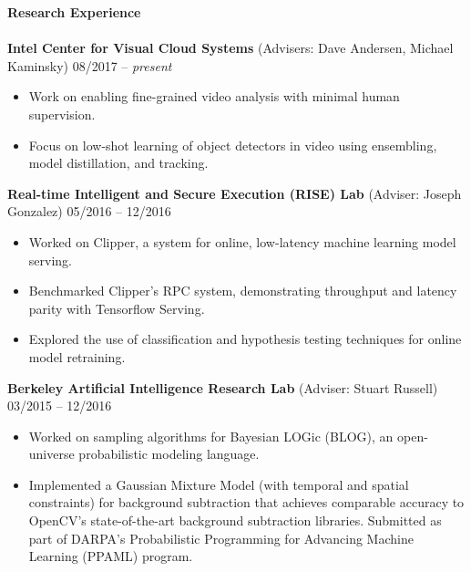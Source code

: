 \documentclass{article}
\begin{document}
\noindent
\textbf{{\Large Research Experience}}\\[-2mm]
\HRule\\
\noindent
\textbf{Intel Center for Visual Cloud Systems} (Advisers: Dave Andersen, Michael Kaminsky)
\hfill 08/2017 -- \textit{present}
\begin{itemize}
\vspace{-2.5mm}
\item Work on enabling fine-grained video analysis with minimal human supervision.
\vspace{-2.5mm}
\item Focus on low-shot learning of object detectors in video using ensembling, model distillation, and tracking.
\end{itemize}
\vspace{-2mm}

\noindent
\textbf{Real-time Intelligent and Secure Execution (RISE) Lab} (Adviser: Joseph Gonzalez)
\hfill 05/2016 -- 12/2016
\begin{itemize}
\vspace{-2.5mm}
\item Worked on Clipper, a system for online, low-latency machine learning model serving.
\vspace{-2.5mm}
\item Benchmarked Clipper's RPC system, demonstrating throughput and latency parity with Tensorflow Serving.
\vspace{-2.5mm}
\item Explored the use of classification and hypothesis testing techniques for online model retraining.
\end{itemize}
\vspace{-2mm}

\noindent
\textbf{Berkeley Artificial Intelligence Research Lab} (Adviser: Stuart Russell)
\hfill 03/2015 -- 12/2016
\begin{itemize}
\vspace{-2.5mm}
\item Worked on sampling algorithms for Bayesian LOGic (BLOG), an open-universe probabilistic modeling language.
\vspace{-6.5mm}
\item Implemented a Gaussian Mixture Model (with temporal and spatial constraints) for background subtraction that achieves comparable accuracy to OpenCV's
      state-of-the-art background subtraction libraries. Submitted as part of DARPA's Probabilistic Programming for Advancing Machine Learning (PPAML) program.
\end{itemize}
\end{document}
